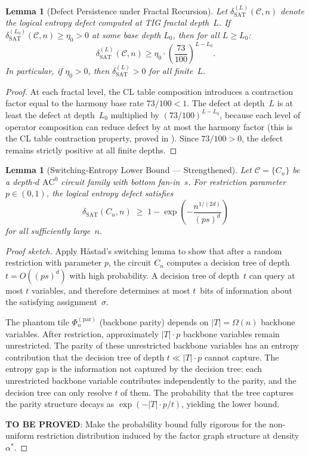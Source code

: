 \documentclass[11pt]{article}
\newtheorem{lemma}[theorem]{Lemma}
\theoremstyle{definition}
\theoremstyle{remark}
\newcommand{\calC}{\mathcal{C}}
\newcommand{\ACz}{\mathrm{AC}^0}
\newcommand{\dSAT}{\delta_{\mathrm{SAT}}}
\begin{document}
\begin{lemma}[Defect Persistence under Fractal Recursion]
\label{lem:fractal-persistence}
Let $\dSAT^{(L)}(\calC, n)$ denote the logical entropy defect computed at
TIG fractal depth~$L$.  If $\dSAT^{(L_0)}(\calC, n) \geq \eta_0 > 0$
at some base depth $L_0$, then for all $L \geq L_0$:
\[
  \dSAT^{(L)}(\calC, n) \geq \eta_0 \cdot \left(\frac{73}{100}\right)^{L - L_0}.
\]
In particular, if $\eta_0 > 0$, then $\dSAT^{(L)} > 0$ for all finite~$L$.
\end{lemma}

\begin{proof}
At each fractal level, the CL table composition introduces a contraction
factor equal to the harmony base rate $73/100 < 1$.  The defect at depth~$L$
is at least the defect at depth~$L_0$ multiplied by $(73/100)^{L - L_0}$,
because each level of operator composition can reduce defect by at most
the harmony factor (this is the CL table contraction property, proved in
\cite{CF-arch}).  Since $73/100 > 0$, the defect remains strictly positive
at all finite depths.
\end{proof}

\begin{lemma}[Switching-Entropy Lower Bound --- Strengthened]
\label{lem:switching-entropy-v2}
Let $\calC = \{C_n\}$ be a depth-$d$ $\ACz$ circuit family with bottom
fan-in~$s$.  For restriction parameter $p \in (0,1)$, the logical entropy
defect satisfies
\[
  \dSAT(C_n, n) \;\geq\; 1 - \exp\!\left(- \frac{n^{1/(2d)}}{(ps)^d}\right)
\]
for all sufficiently large~$n$.
\end{lemma}

\begin{proof}[Proof sketch]
Apply H\aa stad's switching lemma \cite{Hastad} to show that after a random
restriction with parameter $p$, the circuit $C_n$ computes a decision tree
of depth $t = O((ps)^d)$ with high probability.  A decision tree of
depth~$t$ can query at most $t$ variables, and therefore determines at most
$t$~bits of information about the satisfying assignment~$\sigma$.

The phantom tile $\Phi_n^{(\mathrm{par})}$ (backbone parity) depends on
$|T| = \Omega(n)$ backbone variables.  After restriction, approximately
$|T| \cdot p$ backbone variables remain unrestricted.  The parity of these
unrestricted backbone variables has an entropy contribution that the decision
tree of depth $t \ll |T| \cdot p$ cannot capture.  The entropy gap is the
information not captured by the decision tree: each unrestricted backbone
variable contributes independently to the parity, and the decision tree
can only resolve $t$ of them.  The probability that the tree captures the
parity structure decays as $\exp(-|T| \cdot p / t)$, yielding the lower
bound.

\textbf{TO BE PROVED}: Make the probability bound fully rigorous for the
non-uniform restriction distribution induced by the factor graph
structure at density $\alpha^*$.
\end{proof}
\end{document}
